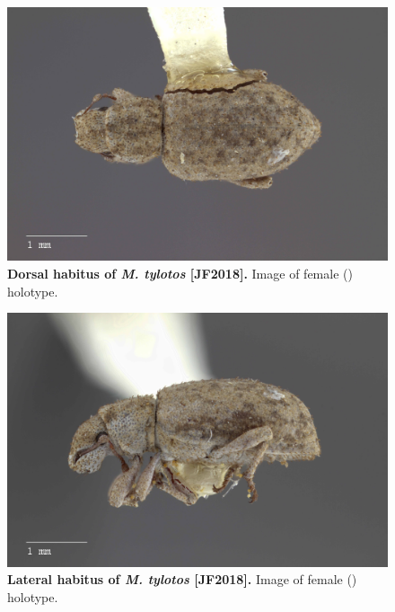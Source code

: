 \documentclass[fleqn,10pt,lineno]{wlpeerj} %
\begin{document}
\begin{figure}[h]
	\begin{sideways}
		\centering
		\includegraphics[height=\textwidth]{tylotos_F_dorsal.jpg}
	\end{sideways}
	\caption{\textbf{Dorsal habitus of \textit{M. tylotos} [JF2018].} Image of female (\female) holotype.}
	\label{fig:tylotos_F_dorsal}
\end{figure}

\begin{figure}[h]
	\begin{sideways}
		\centering
		\includegraphics[height=\textwidth]{tylotos_F_lateral.jpg}
	\end{sideways}
	\caption{\textbf{Lateral habitus of \textit{M. tylotos} [JF2018].} Image of female (\female) holotype.}
	\label{fig:tylotos_F_lateral}
\end{figure}
\end{document}
